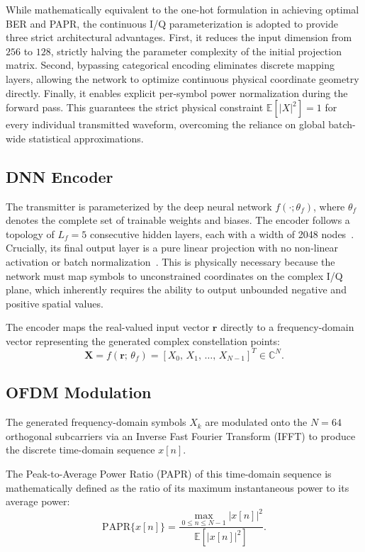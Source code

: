 While mathematically equivalent to the one-hot formulation in achieving optimal BER and PAPR, the continuous I/Q parameterization is adopted to provide three strict architectural advantages. First, it reduces the input dimension from $256$ to $128$, strictly halving the parameter complexity of the initial projection matrix. Second, bypassing categorical encoding eliminates discrete mapping layers, allowing the network to optimize continuous physical coordinate geometry directly. Finally, it enables explicit per-symbol power normalization during the forward pass. This guarantees the strict physical constraint $\mathbb{E}[|X|^2] = 1$ for every individual transmitted waveform, overcoming the reliance on global batch-wide statistical approximations.

\subsection{DNN Encoder}

The transmitter is parameterized by the deep neural network $f(\cdot; \theta_f)$, where $\theta_f$ denotes the complete set of trainable weights and biases. The encoder follows a topology of $L_f = 5$ consecutive hidden layers, each with a width of 2048 nodes~\cite{kim2017novel}. Crucially, its final output layer is a pure linear projection with no non-linear activation or batch normalization~\cite{kim2017novel}. This is physically necessary because the network must map symbols to unconstrained coordinates on the complex I/Q plane, which inherently requires the ability to output unbounded negative and positive spatial values.

The encoder maps the real-valued input vector $\bm{r}$ directly to a frequency-domain vector representing the generated complex constellation points:
\begin{equation*}
    \bm{X} = f(\bm{r};\,\theta_f) = \left[X_0,\, X_1,\, \dots,\, X_{N-1}\right]^T \in \mathbb{C}^N.
\end{equation*}

\subsection{OFDM Modulation}

The generated frequency-domain symbols $X_k$ are modulated onto the $N = 64$ orthogonal subcarriers via an Inverse Fast Fourier Transform (IFFT) to produce the discrete time-domain sequence $x[n]$.

The Peak-to-Average Power Ratio (PAPR) of this time-domain sequence is mathematically defined as the ratio of its maximum instantaneous power to its average power:
\begin{equation*}
    \mathrm{PAPR}\{x[n]\} = \frac{\displaystyle\max_{0 \le n \le N-1} |x[n]|^2}{\mathbb{E}[|x[n]|^2]}.
\end{equation*}

